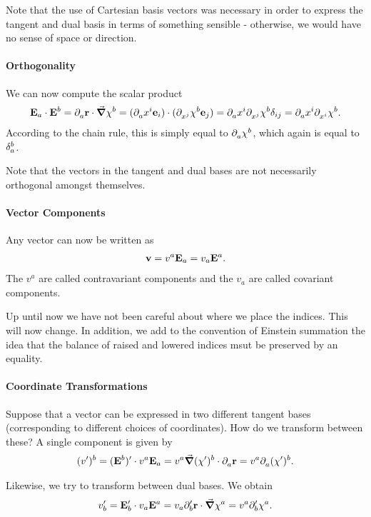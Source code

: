 Note that the use of Cartesian basis vectors was necessary in order to express the tangent and dual basis in terms of something sensible - otherwise, we would have no sense of space or direction.

\paragraph{Orthogonality}
We can now compute the scalar product
\begin{align*}
	\vb{E}_{a}\cdot\vb{E}^{b} = \del{a}{\vb{r}}\cdot\grad{\chi^{b}} = (\del{a}{x^{i}}\vb{e}_{i})\cdot(\del{x^{j}}{\chi^{b}}\vb{e}_{j}) = \del{a}{x^{i}}\del{x^{j}}{\chi^{b}}\delta_{ij} = \del{a}{x^{i}}\del{x^{i}}{\chi^{b}}.
\end{align*}
According to the chain rule, this is simply equal to $\del{a}{\chi^{b}}$, which again is equal to $\kdelta{a}{b}$.

Note that the vectors in the tangent and dual bases are not necessarily orthogonal amongst themselves.

\paragraph{Vector Components}
Any vector can now be written as
\begin{align*}
	\vb{v} = v^{a}\tb{a} = v_{a}\db{a}.
\end{align*}
The $v^{a}$ are called contravariant components and the $v_{a}$ are called covariant components.

Up until now we have not been careful about where we place the indices. This will now change. In addition, we add to the convention of Einstein summation the idea that the balance of raised and lowered indices msut be preserved by an equality.

\paragraph{Coordinate Transformations}
Suppose that a vector can be expressed in two different tangent bases (corresponding to different choices of coordinates). How do we transform between these? A single component is given by
\begin{align*}
	(v')^{b} = (\db{b})'\cdot v^{a}\tb{a} = v^{a}\grad{(\chi')^{b}}\cdot\del{a}{\vb{r}} = v^{a}\del{a}{(\chi')^{b}}.
\end{align*}

Likewise, we try to transform between dual bases. We obtain
\begin{align*}
	v_{b}' = \tb{b}'\cdot v_{a}\db{a} = v_{a}\del[\prime]{b}{\vb{r}}\cdot\grad{\chi^{a}} = v^{a}\del[\prime]{b}{\chi^{a}}.
\end{align*}

